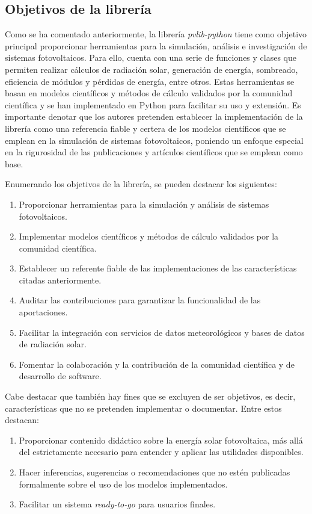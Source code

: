 \subsection{Objetivos de la librería} \label{ssct:pvlib:objetivos}

Como se ha comentado anteriormente, la librería \textit{pvlib-python} tiene como objetivo principal proporcionar herramientas para la simulación, análisis e investigación de sistemas fotovoltaicos. Para ello, cuenta con una serie de funciones y clases que permiten realizar cálculos de radiación solar, generación de energía, sombreado, eficiencia de módulos y pérdidas de energía, entre otros. Estas herramientas se basan en modelos científicos y métodos de cálculo validados por la comunidad científica y se han implementado en Python para facilitar su uso y extensión. Es importante denotar que los autores pretenden establecer la implementación de la librería como una referencia fiable y certera de los modelos científicos que se emplean en la simulación de sistemas fotovoltaicos, poniendo un enfoque especial en la rigurosidad de las publicaciones y artículos científicos que se emplean como base.

Enumerando los objetivos de la librería, se pueden destacar los siguientes:

\begin{enumerate}
      \item Proporcionar herramientas para la simulación y análisis de sistemas fotovoltaicos.
      \item Implementar modelos científicos y métodos de cálculo validados por la comunidad científica.
      \item Establecer un referente fiable de las implementaciones de las características citadas anteriormente.
      \item Auditar las contribuciones para garantizar la funcionalidad de las aportaciones.
      \item Facilitar la integración con servicios de datos meteorológicos y bases de datos de radiación solar.
      \item Fomentar la colaboración y la contribución de la comunidad científica y de desarrollo de software.
\end{enumerate}

Cabe destacar que también hay fines que se excluyen de ser objetivos, es decir, características que no se pretenden implementar o documentar. Entre estos destacan:

\begin{enumerate}
      \item Proporcionar contenido didáctico sobre la energía solar fotovoltaica, más allá del estrictamente necesario para entender y aplicar las utilidades disponibles.
      \item Hacer inferencias, sugerencias o recomendaciones que no estén publicadas formalmente sobre el uso de los modelos implementados.
      \item Facilitar un sistema \textit{ready-to-go} para usuarios finales.
\end{enumerate}

